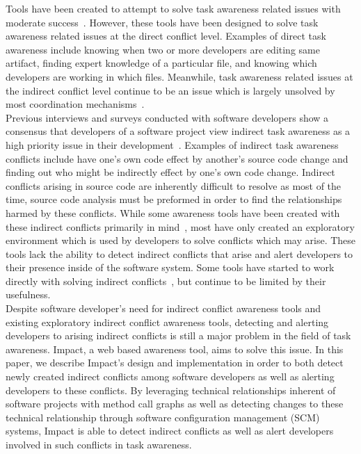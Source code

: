 \documentclass[conference]{IEEEtran}
\begin{document}
Tools have been created to attempt to solve task awareness related issues
with moderate success~\cite{Xiang:2008:ERT, Biehl:2007:FVD, Sarma:2009:TIV, 
Khurana:2009:PFC}. However, these tools have been designed 
to solve task awareness related issues at the direct conflict level. 
Examples of direct task awareness include knowing when two or more 
developers are  editing same artifact, finding expert knowledge of a
particular file, and knowing which developers are working in which files.
Meanwhile, task awareness related issues at the indirect conflict level
continue to be an issue which is largely unsolved by most coordination
mechanisms~\cite{Khurana:2009:PFC}.\\

Previous interviews and surveys conducted with software developers show a 
consensus that developers of a software project view indirect task awareness 
as a high priority issue in their development~\cite{Damian:2007:GSE, 
Halverson:2006:DTV, Begel:2010:CDE}. Examples of indirect task awareness
conflicts include have one's own code effect by another's source
code change and finding out who might be indirectly effect by one's
own code change. Indirect conflicts arising in source code are inherently
difficult to resolve as most of the time, source code analysis must
be preformed in order to find the relationships harmed by these conflicts.
While some awareness tools have been created with these indirect conflicts
primarily in mind~\cite{Begel:2010:CDE, Trainer:2005:BGT}, most have only 
created an exploratory environment which is used by developers to
solve conflicts which may arise. These tools lack the ability to detect
indirect conflicts that arise and alert developers to their presence 
inside of the software system. Some tools have started to work directly
with solving indirect conflicts~\cite{Sarma:2007:TSA}, but continue
to be limited by their usefulness.\\ 

Despite software developer's need for indirect conflict awareness tools
and existing exploratory indirect conflict awareness tools, detecting
and alerting developers to arising indirect conflicts is still a major
problem in the field of task awareness. Impact, a web based awareness
tool, aims to solve this issue. In this paper, we describe Impact's
design and implementation in order to both detect newly created
indirect conflicts among software developers as well as alerting developers
to these conflicts. By leveraging technical relationships inherent of 
software projects with method call graphs as well as detecting changes
to these technical relationship through software configuration management
(SCM) systems, Impact is able to detect indirect conflicts as well as
alert developers involved in such conflicts in task awareness.\\
\end{document}

